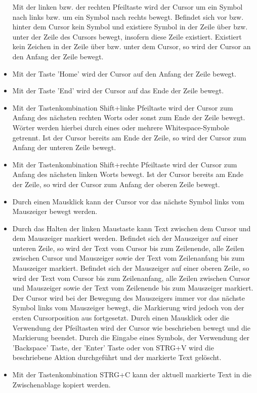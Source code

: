 \documentclass[parskip=full,11pt,twoside]{scrartcl}
\begin{document}
\begin{itemize}
	Mit der linken bzw. der rechten Pfeiltaste wird der Cursor um ein Symbol nach links bzw. um ein Symbol nach rechts bewegt. 
	Befindet sich vor bzw. hinter dem Cursor kein Symbol und existiere Symbol in der Zeile über bzw. unter der Zeile des Cursors bewegt, insofern diese Zeile existiert.
	Existiert kein Zeichen in der Zeile über bzw. unter dem Cursor, so wird der Cursor an den Anfang der Zeile bewegt.
	\item Mit der Taste 'Home' wird der Cursor auf den Anfang der Zeile bewegt.
	\item Mit der Taste 'End' wird der Cursor auf das Ende der Zeile bewegt.
	\item Mit der Tastenkombination Shift+linke Pfeiltaste wird der Cursor zum Anfang des nächsten rechten Worts oder sonst zum Ende der Zeile bewegt. Wörter werden hierbei durch eines oder mehrere Whitespace-Symbole getrennt. Ist der Cursor bereits am Ende der Zeile, so wird der Cursor zum Anfang der unteren Zeile bewegt.
	\item Mit der Tastenkombination Shift+rechte Pfeiltaste wird der Cursor zum Anfang des nächsten linken Worts bewegt. Ist der Cursor bereits am Ende der Zeile, so wird der Cursor zum Anfang der oberen Zeile bewegt.
	\item Durch einen Mausklick kann der Cursor vor das nächste Symbol links vom Mauszeiger bewegt werden.
	\item Durch das Halten der linken Maustaste kann Text zwischen dem Cursor und dem Mauszeiger markiert werden. 
	Befindet sich der Mauszeiger auf einer unteren Zeile, so wird der Text vom Cursor bis zum Zeilenende, alle Zeilen zwischen Cursor und Mauszeiger sowie der Text vom Zeilenanfang bis zum Mauszeiger markiert. 
	Befindet sich der Mauszeiger auf einer oberen Zeile, so wird der Text vom Cursor bis zum Zeilenanfang, alle Zeilen zwischen Cursor und Mauszeiger sowie der Text vom Zeilenende bis zum Mauszeiger markiert. 
	Der Cursor wird bei der Bewegung des Mauszeigers immer vor das nächste Symbol links vom Mauszeiger bewegt, die Markierung wird jedoch von der ersten Cursorposition aus fortgesetzt.
	Durch einen Mausklick oder die Verwendung der Pfeiltasten wird der Cursor wie beschrieben bewegt und die Markierung beendet.
	Durch die Eingabe eines Symbols, der Verwendung der 'Backspace' Taste, der 'Enter' Taste oder von STRG+V wird die beschriebene Aktion durchgeführt und der markierte Text gelöscht.
	\item Mit der Tastenkombination STRG+C kann der aktuell markierte Text in die Zwischenablage kopiert werden.

\end{itemize}
\end{document}
